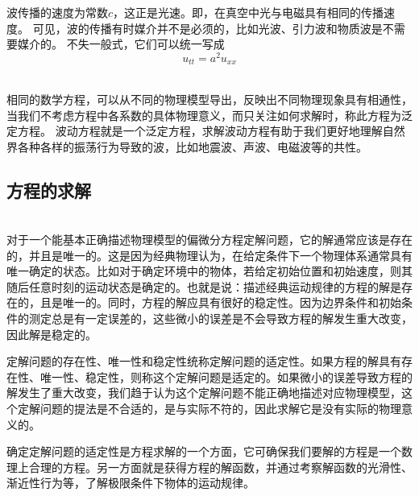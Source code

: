 			波传播的速度为常数$c$，这正是光速。即，在真空中光与电磁具有相同的传播速度。 
			可见，波的传播有时媒介并不是必须的，比如光波、引力波和物质波是不需要媒介的。
			不失一般式，它们可以统一写成
\begin{equation*} 
	u_{tt} = a^2 u_{xx}  
\end{equation*} 
~~\\ 
\begin{hint}
	相同的数学方程，可以从不同的物理模型导出，反映出不同物理现象具有相通性，当我们不考虑方程中各系数的具体物理意义，而只关注如何求解时，称此方程为泛定方程。 波动方程就是一个泛定方程，求解波动方程有助于我们更好地理解自然界各种各样的振荡行为导致的波，比如地震波、声波、电磁波等的共性。
\end{hint}

\subsection{方程的求解} ~\\
对于一个能基本正确描述物理模型的偏微分方程定解问题，它的解通常应该是存在的，并且是唯一的。这是因为经典物理认为，在给定条件下一个物理体系通常具有唯一确定的状态。比如对于确定环境中的物体，若给定初始位置和初始速度，则其随后任意时刻的运动状态是确定的。也就是说：描述经典运动规律的方程的解是存在的，且是唯一的。同时，方程的解应具有很好的稳定性。因为边界条件和初始条件的测定总是有一定误差的，这些微小的误差是不会导致方程的解发生重大改变，因此解是稳定的。

定解问题的存在性、唯一性和稳定性统称定解问题的适定性。如果方程的解具有存在性、唯一性、稳定性，则称这个定解问题是适定的。如果微小的误差导致方程的解发生了重大改变，我们趋于认为这个定解问题不能正确地描述对应物理模型，这个定解问题的提法是不合适的，是与实际不符的，因此求解它是没有实际的物理意义的。

确定定解问题的适定性是方程求解的一个方面，它可确保我们要解的方程是一个数理上合理的方程。另一方面就是获得方程的解函数，并通过考察解函数的光滑性、渐近性行为等，了解极限条件下物体的运动规律。

